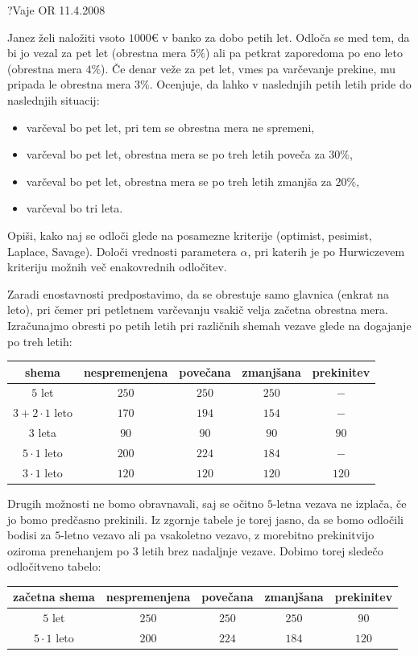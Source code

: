 \begin{naloga}{?}{Vaje OR 11.4.2008}
\begin{vprasanje}
Janez želi naložiti vsoto $1000 €$ v banko za dobo petih let.
Odloča se med tem, da bi jo vezal za pet let (obrestna mera $5\%$)
ali pa petkrat zaporedoma po eno leto (obrestna mera $4\%$).
Če denar veže za pet let, vmes pa varčevanje prekine,
mu pripada le obrestna mera $3\%$.
Ocenjuje, da lahko v naslednjih petih letih pride do naslednjih situacij:
\begin{itemize}
\item varčeval bo pet let, pri tem se obrestna mera ne spremeni,
\item varčeval bo pet let, obrestna mera se po treh letih poveča za $30\%$,
\item varčeval bo pet let, obrestna mera se po treh letih zmanjša za $20\%$,
\item varčeval bo tri leta.
\end{itemize}
Opiši, kako naj se odloči glede na posamezne kriterije
(optimist, pesimist, Laplace, Savage).
Določi vrednosti parametera $\alpha$,
pri katerih je po Hurwiczevem kriteriju možnih več enakovrednih odločitev.
\end{vprasanje}

\begin{odgovor}
Zaradi enostavnosti predpostavimo,
da se obrestuje samo glavnica (enkrat na leto),
pri čemer pri petletnem varčevanju vsakič velja začetna obrestna mera.
Izračunajmo obresti po petih letih pri različnih shemah vezave
glede na dogajanje po treh letih:
\begin{center}
\begin{tabular}{c|cccc}
shema & nespremenjena & povečana & zmanjšana & prekinitev \\ \hline
$5$ let              & $250$ & $250$ & $250$ &   $-$ \\
$3 + 2 \cdot 1$ leto & $170$ & $194$ & $154$ &   $-$ \\
$3$ leta             &  $90$ &  $90$ &  $90$ &  $90$ \\ \hline
$5 \cdot 1$ leto     & $200$ & $224$ & $184$ &   $-$ \\
$3 \cdot 1$ leto     & $120$ & $120$ & $120$ & $120$ \\
\end{tabular}
\end{center}
Drugih možnosti ne bomo obravnavali,
saj se očitno $5$-letna vezava ne izplača, če jo bomo predčasno prekinili.
Iz zgornje tabele je torej jasno,
da se bomo odločili bodisi za $5$-letno vezavo ali pa vsakoletno vezavo,
z morebitno prekinitvijo oziroma prenehanjem po $3$ letih
brez nadaljnje vezave.
Dobimo torej sledečo odločitveno tabelo:
\begin{center}
\begin{tabular}{c|cccc}
začetna shema & nespremenjena & povečana & zmanjšana & prekinitev \\ \hline
$5$ let          & $250$ & $250$ & $250$ &  $90$ \\
$5 \cdot 1$ leto & $200$ & $224$ & $184$ & $120$ \\
\end{tabular}
\end{center}


\end{odgovor}
\end{naloga}
